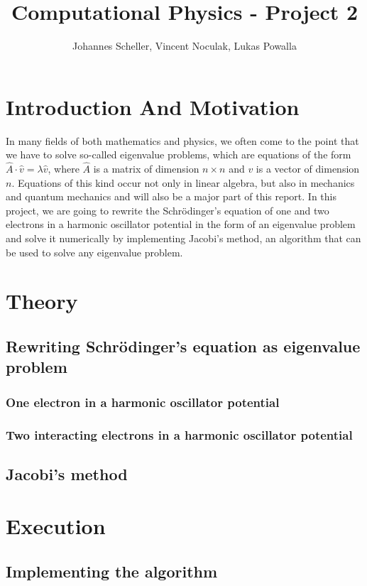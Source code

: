 \documentclass[10pt,a4paper]{article}
\author{Johannes Scheller, Vincent Noculak, Lukas Powalla}
\title{Computational Physics - Project 2}
\begin{document}
\maketitle
\newpage
\tableofcontents
\newpage
\section{Introduction And Motivation}
In many fields of both mathematics and physics, we often come to the point that we have to solve so-called eigenvalue problems, which are equations of the form $\hat{A}\cdot\hat{v}=\lambda\hat{v}$, where $\hat{A}$ is a matrix of dimension $n\times n$ and $v$ is a vector of dimension $n$. Equations of this kind occur not only in linear algebra, but also in mechanics and quantum mechanics and will also be a major part of this report. In this project, we are going to rewrite the Schrödinger's equation of one and two electrons in a harmonic oscillator potential in the form of an eigenvalue problem and solve it numerically by implementing Jacobi's method, an algorithm that can be used to solve any eigenvalue problem.

\section{Theory}
\subsection{Rewriting Schrödinger's equation as eigenvalue problem}
\subsubsection{One electron in a harmonic oscillator potential}
\subsubsection{Two interacting electrons in a harmonic oscillator potential}
\subsection{Jacobi's method}
\section{Execution}
\subsection{Implementing the algorithm}
\end{document}

